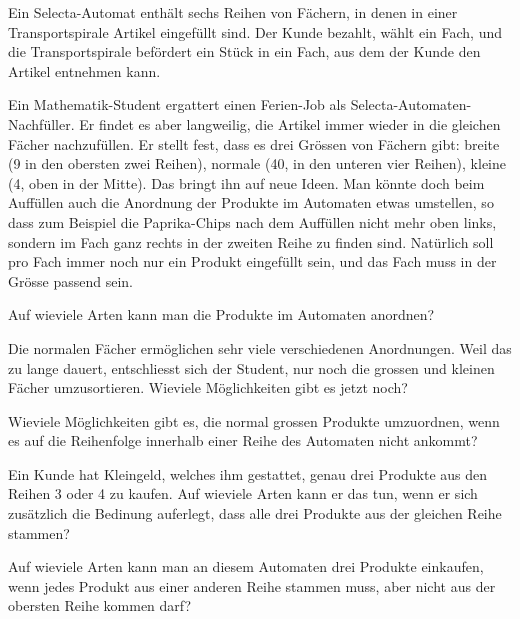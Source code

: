 Ein Selecta-Automat enthält sechs Reihen von Fächern, in denen in einer
Transportspirale Artikel eingefüllt sind. Der Kunde bezahlt, wählt ein
Fach, und die Transportspirale befördert ein Stück in ein Fach, aus dem
der Kunde den Artikel entnehmen kann.
\begin{center}
\end{center}
Ein Mathematik-Student ergattert einen Ferien-Job als
Selecta-Automaten-Nachfüller. Er findet es aber langweilig, die Artikel
immer wieder in die gleichen Fächer nachzufüllen. Er stellt fest,
dass es drei Grössen von Fächern gibt: breite (9 in den obersten zwei Reihen),
normale (40, in den unteren vier Reihen), kleine (4, oben in der Mitte).
Das bringt ihn auf neue Ideen. Man könnte doch beim Auffüllen auch die 
Anordnung der Produkte im Automaten etwas umstellen, so dass zum Beispiel
die Paprika-Chips nach dem Auffüllen nicht mehr oben links, sondern im
Fach ganz rechts in der zweiten Reihe zu finden sind. Natürlich soll
pro Fach immer noch nur ein Produkt eingefüllt sein, und das Fach muss
in der Grösse passend sein.
\begin{teilaufgaben}
\item
Auf wieviele Arten kann man die Produkte im Automaten anordnen?
\item
Die normalen Fächer ermöglichen sehr viele verschiedenen Anordnungen.
Weil das zu lange dauert, entschliesst sich der Student, nur noch die
grossen und kleinen Fächer umzusortieren. Wieviele Möglichkeiten
gibt es jetzt noch?
\item
Wieviele Möglichkeiten gibt es, die normal grossen Produkte
umzuordnen, wenn es auf die Reihenfolge innerhalb einer Reihe des
Automaten nicht ankommt?
\item 
Ein Kunde hat Kleingeld, welches ihm gestattet, genau drei Produkte
aus den Reihen 3 oder 4 zu kaufen. Auf wieviele Arten kann er
das tun, wenn er sich zusätzlich die Bedinung auferlegt, dass alle
drei Produkte aus der gleichen Reihe stammen?
\item
Auf wieviele Arten kann man an diesem Automaten drei Produkte einkaufen, wenn
jedes Produkt aus einer anderen Reihe stammen muss, aber nicht aus
der obersten Reihe kommen darf?
\end{teilaufgaben}


